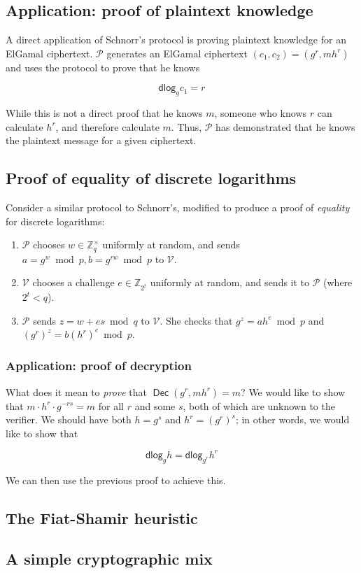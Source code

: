 \documentclass[11pt,twoside,a4paper]{article}
\DeclareMathOperator{\Dec}{\mathsf{Dec}}
\newcommand{\dlog}{\mathsf{dlog}}
\theoremstyle{definition}
\begin{document}
\subsection{Application: proof of plaintext knowledge}
A direct application of Schnorr's protocol is proving plaintext knowledge for an ElGamal ciphertext. $\mathcal{P}$ generates an ElGamal ciphertext $(c_1, c_2)=(g^r, mh^r)$ and uses the protocol to prove that he knows

$$\dlog_g{c_1}=r$$

While this is not a direct proof that he knows $m$, someone who knows $r$ can calculate $h^r$, and therefore calculate $m$. Thus, $\mathcal{P}$ has demonstrated that he knows the plaintext message for a given ciphertext.

\subsection{Proof of equality of discrete logarithms}
Consider a similar protocol to Schnorr's, modified to produce a proof of \textit{equality} for discrete logarithms:
\begin{enumerate}
    \item $\mathcal{P}$ chooses $w\in\mathbb{Z}^\times_q$ uniformly at random, and sends $a=g^w\bmod p,b=g^{rw}\bmod p$ to $\mathcal{V}$.
    \item $\mathcal{V}$ chooses a challenge $e\in\mathbb{Z}_{2^t}$ uniformly at random, and sends it to $\mathcal{P}$ (where $2^t<q$).
    \item $\mathcal{P}$ sends $z=w+es\bmod q$ to $\mathcal{V}$. She checks that $g^z=ah^e\bmod p$ and $(g^r)^z=b(h^r)^e\bmod p$.
\end{enumerate}

\subsubsection{Application: proof of decryption}
What does it mean to \textit{prove} that $\Dec(g^r,mh^r)=m$? We would like to show that $m\cdot h^r\cdot g^{-rs}=m$ for all $r$ and some $s$, both of which are unknown to the verifier. We should have both $h=g^s$ and $h^r=(g^r)^s$; in other words, we would like to show that

$$\dlog_g{h}=\dlog_{g^r}{h^r}$$

We can then use the previous proof to achieve this.
\subsection{The Fiat-Shamir heuristic}
\subsection{A simple cryptographic mix}
\end{document}
